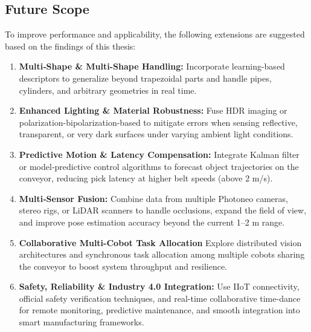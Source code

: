 \documentclass[12pt]{article}
\begin{document}
\subsection{Future Scope }
To improve performance and applicability, the following extensions are suggested based on the findings of this thesis:
\begin{enumerate}    
  \item \textbf{Multi‐Shape \& Multi-Shape Handling:}  
    Incorporate learning-based descriptors to generalize beyond trapezoidal parts and handle pipes, cylinders, and arbitrary geometries in real time.\\
  
  \item \textbf{Enhanced Lighting \& Material Robustness:}  
    Fuse HDR imaging or polarization-bipolarization-based to mitigate errors when sensing reflective, transparent, or very dark surfaces under varying ambient light conditions.\\
  
  \item \textbf{Predictive Motion \& Latency Compensation:}  
    Integrate Kalman filter or model‐predictive control algorithms to forecast object trajectories on the conveyor, reducing pick latency at higher belt speeds (above 2 m/s).\\
  
  \item \textbf{Multi‐Sensor Fusion:}  
    Combine data from multiple Photoneo cameras, stereo rigs, or LiDAR scanners to handle occlusions, expand the field of view, and improve pose estimation accuracy beyond the current 1–2 m range.\\
  
  \item \textbf{Collaborative Multi-Cobot Task Allocation}  
    Explore distributed vision architectures and synchronous task allocation among multiple cobots sharing the conveyor to boost system throughput and resilience.\\
  
  \item \textbf{Safety, Reliability \& Industry 4.0 Integration:}  
  Use IIoT connectivity, official safety verification techniques, and real-time collaborative time-dance for remote monitoring, predictive maintenance, and smooth integration into smart manufacturing frameworks.
\end{enumerate}

\newpage
\printbibliography
\end{document}
